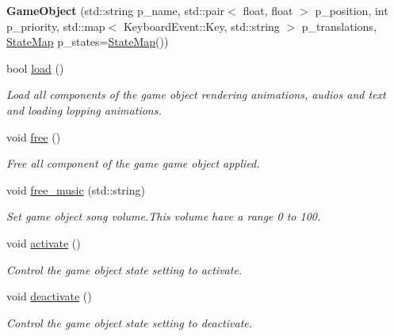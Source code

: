 \begin{DoxyCompactItemize}
\item 
{\bfseries Game\+Object} (std\+::string p\+\_\+name, std\+::pair$<$ float, float $>$ p\+\_\+position, int p\+\_\+priority, std\+::map$<$ Keyboard\+Event\+::\+Key, std\+::string $>$ p\+\_\+translations, \hyperlink{classengine_1_1_state_map}{State\+Map} p\+\_\+states=\hyperlink{classengine_1_1_state_map}{State\+Map}())\hypertarget{classengine_1_1_game_object_a59a216d31883f3acdc8f53b2f316aaa3}{}\label{classengine_1_1_game_object_a59a216d31883f3acdc8f53b2f316aaa3}

\item 
bool \hyperlink{classengine_1_1_game_object_ab6289ed26a76a17506ffb26869904844}{load} ()
\begin{DoxyCompactList}\small\item\em Load all components of the game object rendering animations, audios and text and loading lopping animations. \end{DoxyCompactList}\item 
void \hyperlink{classengine_1_1_game_object_ab4ab356f4d4499ac1edac37f9932056c}{free} ()
\begin{DoxyCompactList}\small\item\em Free all component of the game game object applied. \end{DoxyCompactList}\item 
void \hyperlink{classengine_1_1_game_object_a1ce845a44c4ded5a8da397e00ea15e2c}{free\+\_\+music} (std\+::string)
\begin{DoxyCompactList}\small\item\em Set game object song volume.\+This volume have a range 0 to 100. \end{DoxyCompactList}\item 
void \hyperlink{classengine_1_1_game_object_a1b0eacb99cbbb27e87e12ec54d36a9d7}{activate} ()
\begin{DoxyCompactList}\small\item\em Control the game object state setting to activate. \end{DoxyCompactList}\item 
void \hyperlink{classengine_1_1_game_object_a07959eddddd69a9eee5e1dd3842c193c}{deactivate} ()
\begin{DoxyCompactList}\small\item\em Control the game object state setting to deactivate. \end{DoxyCompactList}\item 

\end{DoxyCompactItemize}
